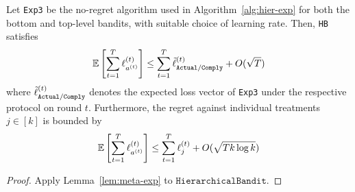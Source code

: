 \begin{thm}\label{thm:cexp}\eod
	Let \texttt{Exp3} be the no-regret algorithm used in Algorithm~\ref{alg:hier-exp} for both the bottom and top-level bandits, with suitable choice of learning rate. Then, \texttt{HB} satisfies
	\begin{equation}
		\operatorname*{\mathbb E}\left[\sum_{t=1}^T\ell^{(t)}_{a^{(t)}}\right]
		\leq \sum_{t=1}^T \tilde{\ell}^{(t)}_{{\texttt{Actual}}/{\texttt{Comply}}}
		+ O(\sqrt{T})
	\end{equation}
	where $\tilde{\ell}^{(t)}_{{\texttt{Actual}}/{\texttt{Comply}}}$ denotes the expected loss vector of \texttt{Exp3} under the respective protocol on round $t$. 
	Furthermore, the regret against individual treatments $j\in[k]$ is bounded by
	\begin{equation}
		\operatorname*{\mathbb E}\left[\sum_{t=1}^{T} \ell^{(t)}_{a^{(t)}}\right]
		\leq \sum_{t=1}^T\ell^{(t)}_{j}
		+ O(\sqrt{T k\log k})
	\end{equation}
\end{thm}

\begin{proof}
	Apply Lemma~\ref{lem:meta-exp} to $\texttt{HierarchicalBandit}$.
\end{proof}



